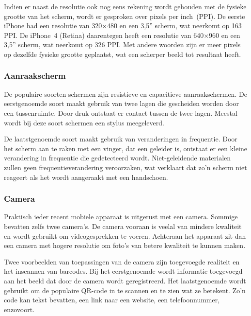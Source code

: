 Indien er naast de resolutie ook nog eens rekening wordt gehouden met de fysieke grootte van het scherm, wordt er gesproken over pixels per inch~(PPI). 
De eerste iPhone had een resolutie van 320$\times$480 en een 3,5” scherm, wat neerkomt op 163 PPI. 
De iPhone~4 (Retina) daarentegen heeft een resolutie van 640$\times$960 en een 3,5” scherm, wat neerkomt op 326 PPI. 
Met andere woorden zijn er meer pixels op dezelfde fysieke grootte geplaatst, wat een scherper beeld tot resultaat heeft. 


\subsubsection{Aanraakscherm}
De populaire soorten schermen zijn resistieve en capacitieve aanraakschermen. 
De eerstgenoemde soort maakt gebruik van twee lagen die gescheiden worden door een tussenruimte. 
Door druk ontstaat er contact tussen de twee lagen. 
Meestal wordt bij deze soort schermen een stylus meegeleverd. 

De laatstgenoemde soort maakt gebruik van veranderingen in frequentie. 
Door het scherm aan te raken met een vinger, dat een geleider is, ontstaat er een kleine verandering in frequentie die gedetecteerd wordt. 
Niet-geleidende materialen zullen geen frequentieverandering veroorzaken, wat verklaart dat zo'n scherm niet reageert als het wordt aangeraakt met een handschoen.

\subsubsection{Camera}
Praktisch ieder recent mobiele apparaat is uitgerust met een camera. 
Sommige bevatten zelfs twee camera's. 
De camera vooraan is veelal van mindere kwaliteit en wordt gebruikt om videogesprekken te voeren. 
Achteraan het apparaat zit dan een camera met hogere resolutie om foto's van betere kwaliteit te kunnen maken.

Twee voorbeelden van toepassingen van de camera zijn toegevoegde realiteit en het inscannen van barcodes.
Bij het eerstgenoemde wordt informatie toegevoegd aan het beeld dat door de camera wordt geregistreerd.
Het laatstgenoemde wordt gebruikt om de populaire QR-code in te scannen en te zien wat ze betekent.
Zo'n code kan tekst bevatten, een link naar een website, een telefoonnummer, enzovoort. 

